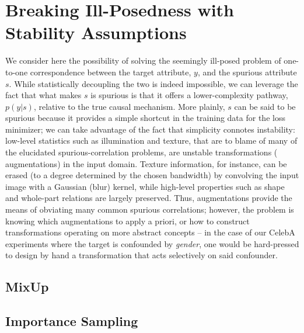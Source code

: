 \section{Breaking Ill-Posedness with Stability Assumptions}

We consider here the possibility of solving the seemingly ill-posed problem of one-to-one
correspondence between the target attribute, $y$, and the spurious attribute $s$. While
statistically decoupling the two is indeed impossible, we can leverage the fact that what makes $s$
is spurious is that it offers a lower-complexity pathway, $p(y|s)$, relative to the true causal
mechanism. More plainly, $s$ can be said to be spurious because it provides a simple shortcut in
the training data for the loss minimizer; we can take advantage of the fact that simplicity
connotes instability: low-level statistics such as illumination and texture, that are to blame of
many of the elucidated spurious-correlation problems, are unstable \wrt transformations (
augmentations) in the input domain. Texture information, for instance, can be erased (to a degree
determined by the chosen bandwidth) by convolving the input image with a Gaussian (blur) kernel,
while high-level properties such as shape and whole-part relations are largely preserved. Thus,
augmentations provide the means of obviating many common spurious correlations; however, the problem is
knowing which augmentations to apply a priori, or how to construct transformations operating on
more abstract concepts -- in the case of our CelebA experiments where the target is confounded by
\emph{gender}, one would be hard-pressed to design by hand a transformation that acts selectively
on said confounder.

\subsection{MixUp}
\subsection{Importance Sampling}

